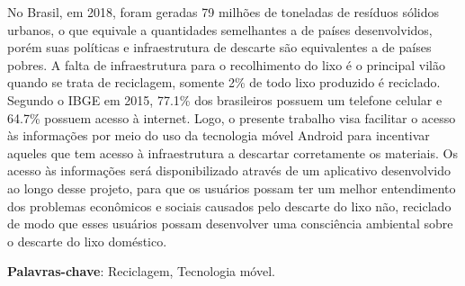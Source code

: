 \documentclass[
	12pt,				%
	openany,			%
	twoside,			%
	a4paper,			%
	english,			%
	french,				%
	spanish,			%
	brazil				%
	]{abntex2}
\begin{document}








\setlength{\absparsep}{18pt} %
\begin{resumo}
No Brasil, em 2018, foram geradas 79 milhões de toneladas de resíduos sólidos urbanos, o que equivale a quantidades semelhantes a de países desenvolvidos, porém suas políticas e infraestrutura de descarte são equivalentes a de países pobres. A falta de infraestrutura para o recolhimento do lixo é o principal vilão quando se trata de reciclagem, somente 2\% de todo lixo produzido é reciclado.
	Segundo o IBGE em 2015, 77.1\% dos brasileiros possuem um telefone celular e 64.7\% possuem acesso à internet. Logo, o presente trabalho visa facilitar o acesso às informações por meio do uso da tecnologia móvel Android para incentivar aqueles que tem acesso à infraestrutura a descartar corretamente os materiais. Os acesso às informações será disponibilizado através de um aplicativo desenvolvido ao longo desse projeto, para que os usuários possam ter um melhor entendimento dos problemas econômicos e sociais causados pelo descarte do lixo não, reciclado de modo que esses usuários possam desenvolver uma consciência ambiental sobre o descarte do lixo doméstico.


 \textbf{Palavras-chave}: Reciclagem, Tecnologia móvel.
\end{resumo}
\end{document}

